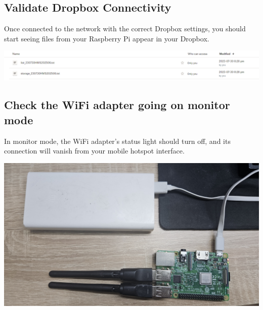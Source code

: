 \documentclass[
  letterpaper,
]{scrbook}
\begin{document}
\subsection{Validate Dropbox
Connectivity}\label{validate-dropbox-connectivity}

Once connected to the network with the correct Dropbox settings, you
should start seeing files from your Raspberry Pi appear in your Dropbox.

\includegraphics{content/material/ch2/check_dropbox_upload.png}

\subsection{Check the WiFi adapter going on monitor
mode}\label{check-the-wifi-adapter-going-on-monitor-mode}

In monitor mode, the WiFi adapter's status light should turn off, and
its connection will vanish from your mobile hotspot interface.

\includegraphics{content/material/ch2/plug_external.jpg}
\end{document}
